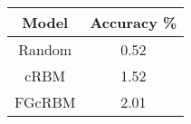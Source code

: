 \documentclass[]{article}
\begin{document}
\begin{tabular}{|c|c|}
	\hline
	Model & Accuracy \% \\
	\hline\hline
	Random & 0.52 \\
	cRBM & 1.52\\
	FGcRBM & 2.01\\
	\hline
\end{tabular}
\end{document}
